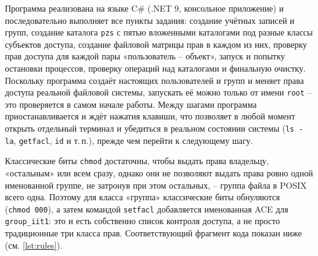 

Программа реализована на языке C\# (.NET 9, консольное приложение) и
последовательно выполняет все пункты задания: создание учётных записей и
групп, создание каталога \texttt{pzs} с пятью вложенными каталогами под
разные классы субъектов доступа, создание файловой матрицы прав в каждом
из них, проверку прав доступа для каждой пары «пользователь -- объект»,
запуск и попытку остановки процессов, проверку операций над каталогами и
финальную очистку. Поскольку программа создаёт настоящих пользователей и
групп и меняет права доступа реальной файловой системы, запускать её
можно только от имени \texttt{root} -- это проверяется в самом начале
работы. Между шагами программа приостанавливается и ждёт нажатия клавиши,
что позволяет в любой момент открыть отдельный терминал и убедиться в
реальном состоянии системы (\texttt{ls~-la}, \texttt{getfacl}, \texttt{id}
и т.\,п.), прежде чем перейти к следующему шагу.

Классические биты \texttt{chmod} достаточны, чтобы выдать права владельцу,
«остальным» или всем сразу, однако они не позволяют выдать права ровно
одной именованной группе, не затронув при этом остальных, -- группа файла
в POSIX всего одна. Поэтому для класса «группа» классические биты
обнуляются (\texttt{chmod~000}), а затем командой \texttt{setfacl}
добавляется именованная ACE для \texttt{group\_iit1}: это и есть
собственно список контроля доступа, а не просто традиционные три класса
прав. Соответствующий фрагмент кода показан ниже (см. \autoref{lst:rules}).

